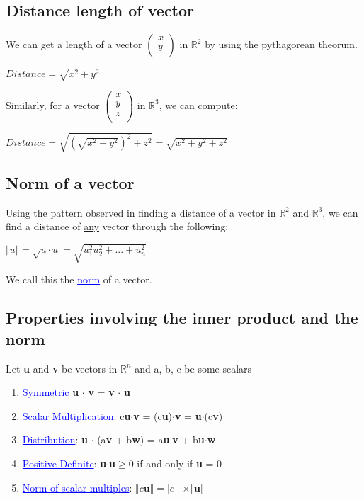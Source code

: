 \documentclass{article}
\newcommand{\bul}[1]{\textcolor{blue}{\underline{#1}}}
\newcommand{\sbreak}{\vspace{10pt}}
\begin{document}
\subsection{Distance length of vector}
We can get a length of a vector $\begin{pmatrix}
    x\\
    y\\
\end{pmatrix}$ in $\mathbb{R}^2$ by using the pythagorean theorum.

\begin{center}
    $Distance = \sqrt{x^2+y^2}$
\end{center}

\sbreak

Similarly, for a vector $\begin{pmatrix}
    x \\
    y \\
    z\\
\end{pmatrix}$ in $\mathbb{R}^3$, we can compute:

\begin{center}
    $Distance = \sqrt{(\sqrt{x^2+y^2})^2 + z^2} = \sqrt{x^2+y^2+z^2}$
\end{center}

\subsection{Norm of a vector}
Using the pattern observed in finding a distance of a vector in $\mathbb{R}^2$ and $\mathbb{R}^3$, we can find a distance of \underline{any} vector through the following:

\begin{center}
    $\Vert u \Vert = \sqrt{u\cdot u} = \sqrt{u_1^2u_2^2+...+u_n^2}$
\end{center}

We call this the \bul{norm} of a vector.

\subsection{Properties involving the inner product and the norm}
Let \textbf{u} and \textbf{v} be vectors in $\mathbb{R}^n$ and a, b, c be some scalars

\begin{enumerate}
    \item \bul{Symmetric} \textbf{u} $\cdot$ \textbf{v} = \textbf{v} $\cdot$ \textbf{u}
    \item \bul{Scalar Multiplication}: c\textbf{u}$\cdot$\textbf{v} = (c\textbf{u})$\cdot$\textbf{v} = \textbf{u}$\cdot$(c\textbf{v})
    \item \bul{Distribution}: \textbf{u} $\cdot$ (a\textbf{v} + b\textbf{w}) = a\textbf{u}$\cdot$\textbf{v} + b\textbf{u}$\cdot$\textbf{w}
    \item \bul{Positive Definite}: \textbf{u}$\cdot$\textbf{u}$\geq$0 if and only if \textbf{u} = 0
    \item \bul{Norm of scalar multiples}: $\Vert c\textbf{u}\Vert = \mid c \mid \times \Vert \textbf{u} \Vert$
\end{enumerate}
\end{document}
